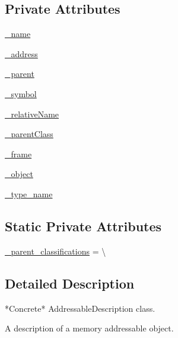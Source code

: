 \subsection*{Private Attributes}
\begin{DoxyCompactItemize}
\item 
\hyperlink{classmemoryoracle_1_1descriptions_1_1InstanceDescription_a63e847dcd05fe43e43415bbff19cf32b}{\+\_\+name}
\item 
\hyperlink{classmemoryoracle_1_1descriptions_1_1InstanceDescription_ac6750a694369f46d02e51af5341fb6c6}{\+\_\+address}
\item 
\hyperlink{classmemoryoracle_1_1descriptions_1_1InstanceDescription_aa814f3c9e403a29ebdc8c41eba7be20d}{\+\_\+parent}
\item 
\hyperlink{classmemoryoracle_1_1descriptions_1_1InstanceDescription_a1e2b63549184bf07f6dc523ac68f6f5f}{\+\_\+symbol}
\item 
\hyperlink{classmemoryoracle_1_1descriptions_1_1InstanceDescription_ab0ee3b8bb6911dce09c8dc9bedeeb459}{\+\_\+relative\+Name}
\item 
\hyperlink{classmemoryoracle_1_1descriptions_1_1InstanceDescription_aa481260908e2494221a947d8e97b8e8b}{\+\_\+parent\+Class}
\item 
\hyperlink{classmemoryoracle_1_1descriptions_1_1InstanceDescription_a73b12220373337079c5e3586525e2a01}{\+\_\+frame}
\item 
\hyperlink{classmemoryoracle_1_1descriptions_1_1InstanceDescription_ac6bc09c17d37664dd03251f1ebccc724}{\+\_\+object}
\item 
\hyperlink{classmemoryoracle_1_1descriptions_1_1InstanceDescription_a4d1eff692c0720c4c3c567b89d34963c}{\+\_\+type\+\_\+name}
\end{DoxyCompactItemize}
\subsection*{Static Private Attributes}
\begin{DoxyCompactItemize}
\item 
\hyperlink{classmemoryoracle_1_1descriptions_1_1InstanceDescription_afe67235ea54bc1c61f31ce9a9cb95a4b}{\+\_\+parent\+\_\+classifications} = \textbackslash{}
\end{DoxyCompactItemize}


\subsection{Detailed Description}
\begin{DoxyVerb}*Concrete* AddressableDescription class.

A description of a memory addressable object.
\end{DoxyVerb}
 

